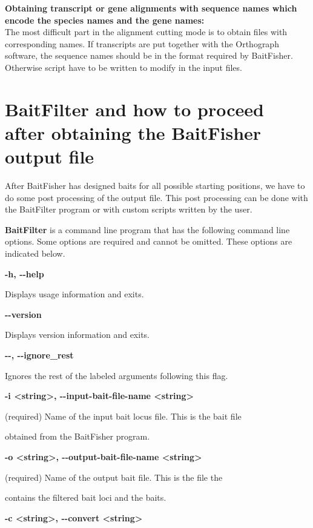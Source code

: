 \documentclass[a4paper,pdflatex,11pt]{article}
\begin{document}
{\bf Obtaining transcript or gene alignments with sequence names which encode the species names and the gene names:}\\
The most difficult part in the alignment cutting mode is to obtain files with corresponding names.
If transcripts are put together with the Orthograph software, the sequence names should be in the format
required by BaitFisher. Otherwise script have to be written to modify in the input files.



\section{BaitFilter and how to proceed after obtaining the BaitFisher output file}

After BaitFisher has designed baits for all possible starting positions,
we have to do some post processing of the output file. This post processing
can be done with the BaitFilter program or with custom scripts written by the user.

\textbf{BaitFilter} is a command line program that has the following
command line options. Some options are required and cannot be omitted.
These options are indicated below.

\textbf{-h, -\/-help}

Displays usage information and exits.

\textbf{-\/-version}

Displays version information and exits.

\textbf{-\/-, -\/-ignore\_rest}

Ignores the rest of the labeled arguments following this flag.

\textbf{-i \textless string\textgreater , -\/-input-bait-file-name
\textless string\textgreater }

(required) Name of the input bait locus file. This is the bait file

obtained from the BaitFisher program.

\textbf{-o \textless string\textgreater , -\/-output-bait-file-name
\textless string\textgreater }

(required) Name of the output bait file. This is the file the

contains the filtered bait loci and the baits.

\textbf{-c \textless string\textgreater , -\/-convert
\textless string\textgreater }
\end{document}
